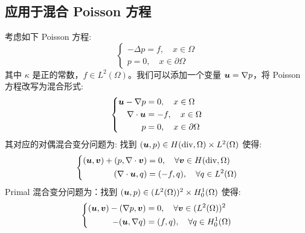\documentclass[lang=cn,a4paper,newtx]{elegantpaper}
\begin{document}
\subsection{应用于混合 Poisson 方程}
考虑如下 Poisson 方程:
\begin{equation}
\label{poisson}
\left\{
\begin{aligned}
    -\Delta p = f, \quad x\in \Omega\\
    p = 0, \quad x\in \partial\Omega
\end{aligned}
\right.
\end{equation}
其中 $\kappa$ 是正的常数，$f\in L^2(\Omega)$。我们可以添加一个变量 $\boldsymbol{u} = \nabla
p$，将 Poisson 方程改写为混合形式:
\begin{equation}
    \label{mixedpoisson}
\left\{
    \begin{aligned}
        \boldsymbol{u} - \nabla p &= 0, \quad x\in \Omega\\
        \nabla\cdot \boldsymbol{u} & = -f, \quad x\in \Omega\\
        p & = 0, \quad x\in \partial\Omega
    \end{aligned}
\right.
\end{equation}
其对应的对偶混合变分问题为: 找到 $(\boldsymbol{u}, p)\in H(\mathrm{div}, \Omega)\times L^2(\Omega)$
使得:
\begin{equation}
\label{mixedvar}
\left\{
\begin{aligned}
    (\boldsymbol{u}, \boldsymbol{v}) + (p, \nabla\cdot \boldsymbol{v}) &= 0, \quad \forall \boldsymbol{v}\in H(\mathrm{div}, \Omega)\\
    (\nabla\cdot \boldsymbol{u}, q) &= (-f, q), \quad \forall q\in L^2(\Omega)
\end{aligned}
\right.
\end{equation}
Primal 混合变分问题为：找到 $(\boldsymbol{u}, p)\in (L^2(\Omega))^2\times H^1_0(\Omega)$ 使得:
\begin{equation}
\label{mixedvar1}
\left\{
\begin{aligned}
    (\boldsymbol{u}, \boldsymbol{v}) - (\nabla p, \boldsymbol{v}) &= 0, \quad \forall \boldsymbol{v}\in (L^2(\Omega))^2\\
    -(\boldsymbol{u}, \nabla q) &= (f, q), \quad \forall q\in H^1_0(\Omega)
\end{aligned}
\right.
\end{equation}
 
\end{document}
